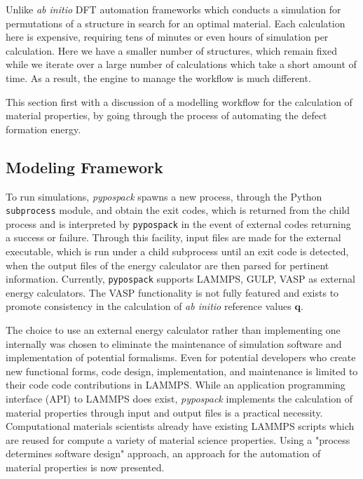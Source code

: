 Unlike \emph{ab initio} DFT automation frameworks which conducts a simulation for permutations of a structure in search for an optimal material.  Each calculation here is expensive, requiring tens of minutes or even hours of simulation per calculation.  Here we have a smaller number of structures, which remain fixed while we iterate over a large number of calculations which take a short amount of time.  As a result, the engine to manage the workflow is much different.

This section first with a discussion of a modelling workflow for the calculation of material properties, by going through the process of automating the defect formation energy.

\subsection{Modeling Framework}

To run simulations, \emph{pypospack} spawns a new process, through the Python \verb|subprocess| module, and obtain the exit codes, which is returned from the child process and is interpreted by \verb|pypospack| in the event of external codes returning a success or failure.  Through this facility, input files are made for the external executable, which is run under a child subprocess until an exit code is detected, when the output files of the energy calculator are then parsed for pertinent information.  Currently, \verb|pypospack| supports LAMMPS, GULP, VASP as external energy calculators.  The VASP functionality is not fully featured and exists to promote consistency in the calculation of \emph{ab initio} reference values $\bm{q}$.

The choice to use an external energy calculator rather than implementing one internally was chosen to eliminate the maintenance of simulation software and implementation of potential formalisms.  Even for potential developers who create new functional forms, code design, implementation, and maintenance is limited to their code code contributions in LAMMPS.
While an application programming interface (API) to LAMMPS does exist, \emph{pypospack} implements the calculation of material properties through input and output files is a practical necessity.  Computational materials scientists already have existing LAMMPS scripts which are reused for compute a variety of material science properties.  Using a "process determines software design" approach, an approach for the automation of material properties is now presented.

